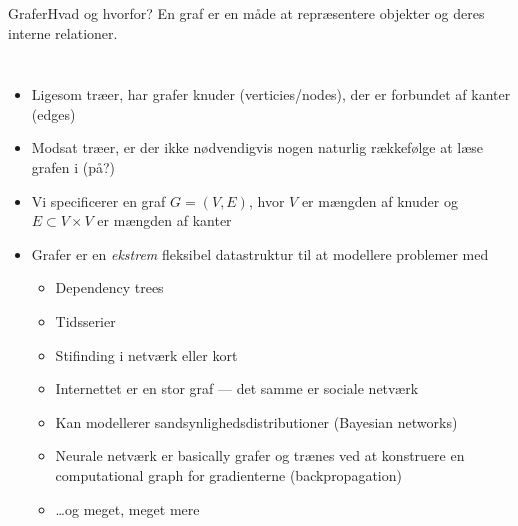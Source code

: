 \documentclass[aspectratio=1610]{beamer}
\begin{document}
\begin{frame}{Grafer}{Hvad og hvorfor?}
    En graf er en måde at repræsentere objekter og deres interne relationer.

    \begin{columns}
        \begin{itemize}[<+(1)->]
            \small
            \item Ligesom træer, har grafer \alert{knuder} (verticies/nodes),
                der er forbundet af \alert{kanter} (edges)
            \item Modsat træer, er der ikke nødvendigvis nogen naturlig rækkefølge
                at læse grafen i (på?)
            \item Vi specificerer en graf $G = (V,E)$, hvor $V$ er mængden af
                knuder og $E \subset V \times V$ er mængden af kanter
            \item Grafer er en \textit{ekstrem} fleksibel datastruktur til at
                modellere problemer med
                \begin{itemize}
                    \footnotesize
                    \item Dependency trees
                    \item Tidsserier
                    \item Stifinding i netværk eller kort
                    \item Internettet er en stor graf --- det samme er sociale
                        netværk
                    \item Kan modellerer sandsynlighedsdistributioner (Bayesian
                        networks)
                    \item Neurale netværk er basically grafer og trænes ved at
                        konstruere en computational graph for gradienterne
                        (backpropagation)
                    \item \ldots og meget, meget mere
                \end{itemize}
        \end{itemize}
    
    \end{columns}

\end{frame}
\end{document}
